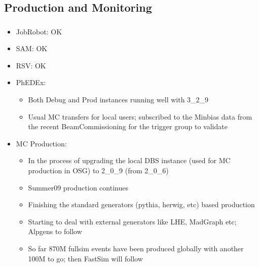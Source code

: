 \documentclass{beamer}
\begin{document}
\subsection{Production and Monitoring}
\begin{frame}
\frametitle{}
\begin{itemize}
	\item JobRobot: OK
	\item SAM: OK
	\item RSV: OK
	\item PhEDEx:
	\begin{itemize}
		\item Both Debug and Prod instances running well with 3\_2\_9
		\item Usual MC transfers for local users; subscribed to the Minbias data from the recent BeamCommissioning for the trigger group to validate
	\end{itemize}
	\item MC Production:
	\begin{itemize}
		\item In the process of upgrading the local DBS instance (used for MC production in OSG) to 2\_0\_9 (from 2\_0\_6)
		\item Summer09 production continues
		\item Finishing the standard generators (pythia, herwig, etc) based production
		\item Starting to deal with external generators like LHE, MadGraph etc; Alpgens to follow
		\item So far 870M fullsim events have been produced globally with another 100M to go; then FastSim will follow
	\end{itemize}

\end{itemize}
\end{frame}
\end{document}
